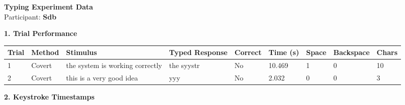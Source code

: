 \documentclass[10pt,a4paper]{article}
\begin{document}

\begin{center}
    {\Large\bfseries Typing Experiment Data}\\
    \vspace{2pt}
    Participant: \textbf{Sdb}
\end{center}

\vspace{0.25cm}


\noindent
{\large\bfseries 1. Trial Performance}

\vspace{0.08cm}

\begin{center}
\begin{tabularx}{\textwidth}{
    C{0.45in}
    C{0.65in}
    L{2.35in}
    L{2.55in}
    C{0.65in}
    C{0.65in}
    C{0.55in}
    C{0.75in}
    C{0.55in}
}
\toprule

\textbf{Trial} &
\textbf{Method} &
\textbf{Stimulus} &
\textbf{Typed Response} &
\textbf{Correct} &
\textbf{Time (s)} &
\textbf{Space} &
\textbf{Backspace} &
\textbf{Chars}
\\

\midrule

1 &
Covert &
the system is working correctly &
the syystr &
No &
10.469 &
1 &
0 &
10
\\

2 &
Covert &
this is a very good idea &
yyy &
No &
2.032 &
0 &
0 &
3
\\

\bottomrule
\end{tabularx}
\end{center}

\vspace{0.35cm}


\noindent
{\large\bfseries 2. Keystroke Timestamps}

\vspace{0.08cm}
\end{document}
